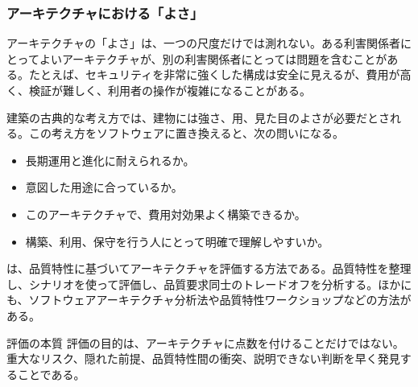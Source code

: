 \subsubsection{アーキテクチャにおける「よさ」}
アーキテクチャの「よさ」は、一つの尺度だけでは測れない。ある利害関係者にとってよいアーキテクチャが、別の利害関係者にとっては問題を含むことがある。たとえば、セキュリティを非常に強くした構成は安全に見えるが、費用が高く、検証が難しく、利用者の操作が複雑になることがある。

建築の古典的な考え方では、建物には強さ、用、見た目のよさが必要だとされる。この考え方をソフトウェアに置き換えると、次の問いになる。
\begin{itemize}
  \item 長期運用と進化に耐えられるか。
  \item 意図した用途に合っているか。
  \item このアーキテクチャで、費用対効果よく構築できるか。
  \item 構築、利用、保守を行う人にとって明確で理解しやすいか。
\end{itemize}

は、品質特性に基づいてアーキテクチャを評価する方法である。品質特性を整理し、シナリオを使って評価し、品質要求同士のトレードオフを分析する。ほかにも、ソフトウェアアーキテクチャ分析法や品質特性ワークショップなどの方法がある。

\begin{statementbox}{評価の本質}
評価の目的は、アーキテクチャに点数を付けることだけではない。重大なリスク、隠れた前提、品質特性間の衝突、説明できない判断を早く発見することである。
\end{statementbox}
